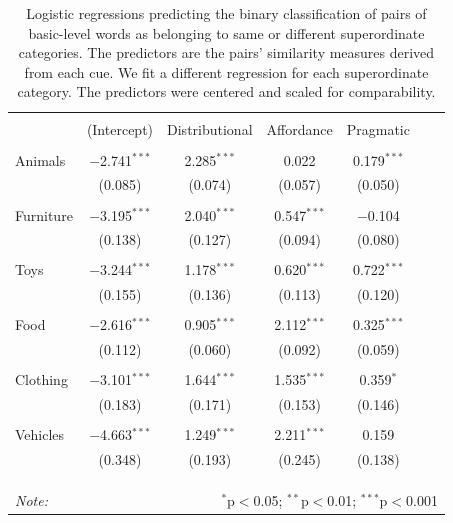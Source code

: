 \documentclass[english,,man]{apa6}
\begin{document}
\begin{table}[!htbp] \centering 
\caption{\label{tab:regressions} Logistic regressions predicting the binary classification of pairs of basic-level words as belonging to same or different superordinate categories. The predictors are the pairs' similarity measures derived from each cue. We fit a different regression for each superordinate category. The predictors were centered and scaled for comparability.} 
\label{} 
\begin{tabular}{@{\extracolsep{5pt}}lcccccc} 
\hline 
 & \multicolumn{4}{c}{} \\
 & (Intercept) & Distributional & Affordance & Pragmatic \\ 
\hline \\[-1.8ex] 
  Animals & $-$2.741$^{***}$ & 2.285$^{***}$ & 0.022 & 0.179$^{***}$\\
  & (0.085) & (0.074) & (0.057) & (0.050)\\
  & & & & & & \\
  Furniture & $-$3.195$^{***}$ & 2.040$^{***}$ & 0.547$^{***}$ & $-$0.104\\
  & (0.138) & (0.127) & (0.094) & (0.080) &\\
  & & & & & & \\
  Toys & $-$3.244$^{***}$ & 1.178$^{***}$ &  0.620$^{***}$ & 0.722$^{***}$\\
  & (0.155) & (0.136) & (0.113) & (0.120) &\\
  & & & & & & \\
  Food & $-$2.616$^{***}$ & 0.905$^{***}$ & 2.112$^{***}$ & 0.325$^{***}$\\
  & (0.112) & (0.060) & (0.092) & (0.059)\\
  & & & & & & \\
  Clothing & $-$3.101$^{***}$ & 1.644$^{***}$ & 1.535$^{***}$ & 0.359$^{*}$\\
  & (0.183) & (0.171) & (0.153) & (0.146)\\
  & & & & & & \\
  Vehicles & $-$4.663$^{***}$ & 1.249$^{***}$ & 2.211$^{***}$ & 0.159\\
  & (0.348) & (0.193) & (0.245) & (0.138)\\
  & & & & & & \\
 \\[-1.8ex] 

\hline \\[-1.8ex] 
\textit{Note:}  & \multicolumn{6}{r}{$^{*}$p$<$0.05; $^{**}$p$<$0.01; $^{***}$p$<$0.001} \\ 
\end{tabular} 
\end{table}
\end{document}

